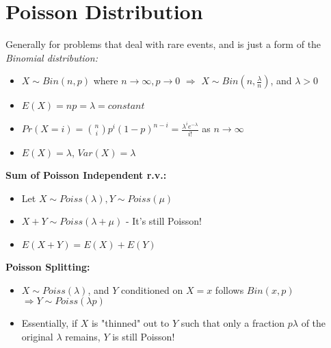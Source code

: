 \documentclass[a4paper]{article}
\begin{document}
\section{Poisson Distribution}
Generally for problems that deal with rare events, and is just a form of the \textit{Binomial distribution:}
\begin{itemize}
    \item $X \sim Bin(n,p)$ where $n \rightarrow \infty, p \rightarrow 0$ $\Rightarrow$ $X \sim Bin(n, \frac{\lambda}{n})$, and $\lambda > 0$
    \item $E(X) = np = \lambda = constant$
    \item $Pr(X = i) = \binom{n}{i}p^i(1-p)^{n-i} = \frac{\lambda^ie^{-\lambda}}{i!}$ as $n \rightarrow \infty$
    \item $E(X) = \lambda$, $Var(X) = \lambda$
\end{itemize}
\textbf{Sum of Poisson Independent r.v.:}
\begin{itemize}
    \item Let $X \sim Poiss(\lambda), Y \sim Poiss(\mu)$
    \item $X + Y \sim Poiss(\lambda + \mu)$ - {It's still Poisson!}
    \item $E(X + Y) = E(X) + E(Y)$
\end{itemize}
\textbf{Poisson Splitting:}
\begin{itemize}
    \item $X \sim Poiss(\lambda)$, and $Y$ conditioned on $X=x$ follows $Bin(x,p)$\\ $\Rightarrow Y \sim Poiss(\lambda p)$
    \item Essentially, if $X$ is "thinned" out to $Y$ such that only a fraction $p\lambda$ of the original $\lambda$ remains, $Y$ is still Poisson!
\end{itemize}
\end{document}
